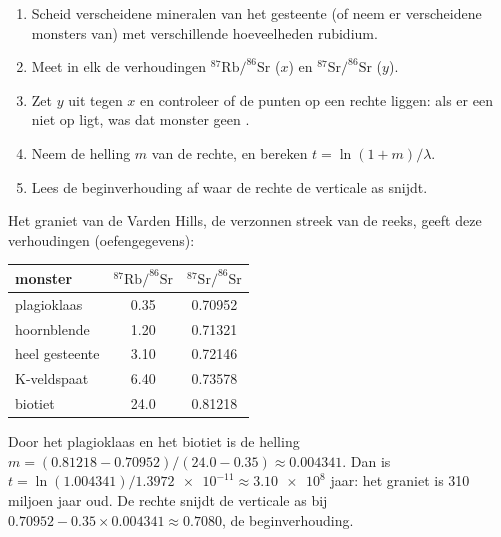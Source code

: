 \begin{method}\label{met:g12:age-of-the-earth:isochron}
\begin{enumerate}
  \item Scheid verscheidene mineralen van het gesteente (of neem er verscheidene monsters
        van) met verschillende hoeveelheden rubidium.
  \item Meet in elk de verhoudingen $^{87}\mathrm{Rb}/^{86}\mathrm{Sr}$ ($x$)
        en $^{87}\mathrm{Sr}/^{86}\mathrm{Sr}$ ($y$).
  \item Zet $y$ uit tegen $x$ en controleer of de punten op een rechte
        liggen: als er een niet op ligt, was dat monster geen .
  \item Neem de helling $m$ van de rechte, en bereken $t = \ln(1+m)/\lambda$.
  \item Lees de beginverhouding af waar de rechte de verticale as snijdt.
\end{enumerate}
\end{method}

\begin{example}\label{ex:g12:age-of-the-earth:varden}
Het graniet van de Varden Hills, de verzonnen streek van de reeks, geeft deze
verhoudingen (oefengegevens):
\begin{center}
\small
\begin{tabular}{|l|c|c|}
\hline
monster & $^{87}\mathrm{Rb}/^{86}\mathrm{Sr}$ & $^{87}\mathrm{Sr}/^{86}\mathrm{Sr}$ \\
\hline
plagioklaas & 0.35 & 0.70952 \\
hoornblende  & 1.20 & 0.71321 \\
heel gesteente  & 3.10 & 0.72146 \\
K-veldspaat  & 6.40 & 0.73578 \\
biotiet     & 24.0 & 0.81218 \\
\hline
\end{tabular}
\end{center}
Door het plagioklaas en het biotiet is de helling
$m = (0.81218 - 0.70952)/(24.0 - 0.35) \approx 0.004341$. Dan is
$t = \ln(1.004341)/\num{1.3972e-11} \approx \num{3.10e8}$ jaar:
het graniet is 310 miljoen jaar oud. De rechte snijdt de verticale as bij
$0.70952 - 0.35 \times 0.004341 \approx 0.7080$, de beginverhouding.
\end{example}

